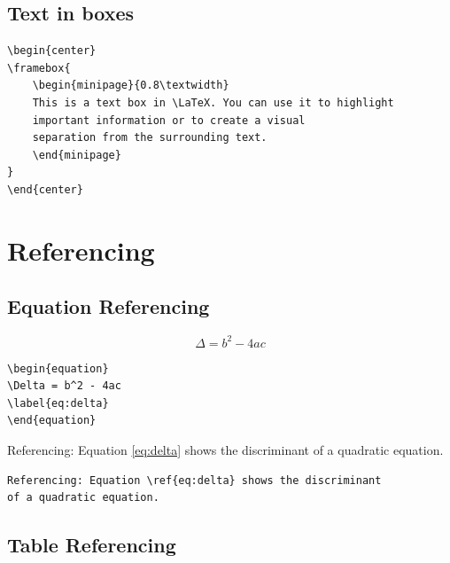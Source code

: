 \documentclass[12pt]{article}
\begin{document}
\subsection{Text in boxes}

\begin{center}
\end{center}


\begin{verbatim}
\begin{center}
\framebox{
    \begin{minipage}{0.8\textwidth}
    This is a text box in \LaTeX. You can use it to highlight 
    important information or to create a visual 
    separation from the surrounding text.
    \end{minipage}
}
\end{center}
\end{verbatim}


\section{Referencing}

\subsection{Equation Referencing}

\begin{equation}
\Delta = b^2 - 4ac
\label{eq:delta}
\end{equation}

\begin{verbatim}
\begin{equation}
\Delta = b^2 - 4ac
\label{eq:delta}
\end{equation}
\end{verbatim}

Referencing: Equation \ref{eq:delta} shows the discriminant of a quadratic equation.

\begin{verbatim}
Referencing: Equation \ref{eq:delta} shows the discriminant 
of a quadratic equation.
\end{verbatim}

\subsection{Table Referencing}
\end{document}
